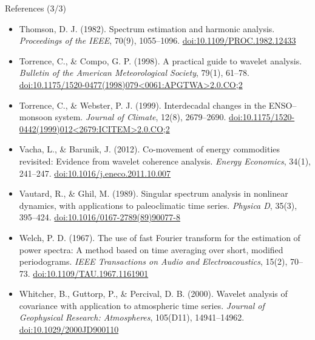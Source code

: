 \begin{frame}{References (3/3)}
\begin{itemize}
    \item Thomson, D. J. (1982). Spectrum estimation and harmonic analysis. \textit{Proceedings of the IEEE}, 70(9), 1055--1096. \href{https://doi.org/10.1109/PROC.1982.12433}{doi:10.1109/PROC.1982.12433}
    \item Torrence, C., \& Compo, G. P. (1998). A practical guide to wavelet analysis. \textit{Bulletin of the American Meteorological Society}, 79(1), 61--78. \href{https://doi.org/10.1175/1520-0477(1998)079\%3C0061:APGTWA\%3E2.0.CO;2}{doi:10.1175/1520-0477(1998)079\textless{}0061:APGTWA\textgreater{}2.0.CO;2}
    \item Torrence, C., \& Webster, P. J. (1999). Interdecadal changes in the ENSO--monsoon system. \textit{Journal of Climate}, 12(8), 2679--2690. \href{https://doi.org/10.1175/1520-0442(1999)012\%3C2679:ICITEM\%3E2.0.CO;2}{doi:10.1175/1520-0442(1999)012\textless{}2679:ICITEM\textgreater{}2.0.CO;2}
    \item Vacha, L., \& Barunik, J. (2012). Co-movement of energy commodities revisited: Evidence from wavelet coherence analysis. \textit{Energy Economics}, 34(1), 241--247. \href{https://doi.org/10.1016/j.eneco.2011.10.007}{doi:10.1016/j.eneco.2011.10.007}
    \item Vautard, R., \& Ghil, M. (1989). Singular spectrum analysis in nonlinear dynamics, with applications to paleoclimatic time series. \textit{Physica D}, 35(3), 395--424. \href{https://doi.org/10.1016/0167-2789(89)90077-8}{doi:10.1016/0167-2789(89)90077-8}
    \item Welch, P. D. (1967). The use of fast Fourier transform for the estimation of power spectra: A method based on time averaging over short, modified periodograms. \textit{IEEE Transactions on Audio and Electroacoustics}, 15(2), 70--73. \href{https://doi.org/10.1109/TAU.1967.1161901}{doi:10.1109/TAU.1967.1161901}
    \item Whitcher, B., Guttorp, P., \& Percival, D. B. (2000). Wavelet analysis of covariance with application to atmospheric time series. \textit{Journal of Geophysical Research: Atmospheres}, 105(D11), 14941--14962. \href{https://doi.org/10.1029/2000JD900110}{doi:10.1029/2000JD900110}
\end{itemize}
\end{frame}


